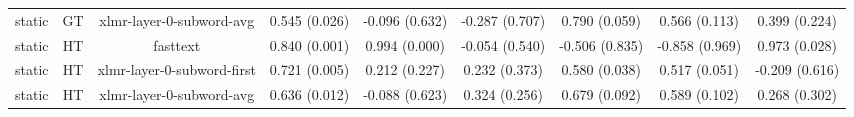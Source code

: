 \begin{sidewaystable}[htb]
\begin{tabular}{@{}ccccccccc@{}}
        static & GT & xlmr-layer-0-subword-avg & 0.545 (0.026) & -0.096 (0.632) & -0.287 (0.707) & 0.790 (0.059) & 0.566 (0.113) & 0.399 (0.224) \\
        static & HT & fasttext & 0.840 (0.001) & 0.994 (0.000) & -0.054 (0.540) & -0.506 (0.835) & -0.858 (0.969) & 0.973 (0.028) \\
        static & HT & xlmr-layer-0-subword-first & 0.721 (0.005) & 0.212 (0.227) & 0.232 (0.373) & 0.580 (0.038) & 0.517 (0.051) & -0.209 (0.616) \\
        static & HT & xlmr-layer-0-subword-avg & 0.636 (0.012) & -0.088 (0.623) & 0.324 (0.256) & 0.679 (0.092) & 0.589 (0.102) & 0.268 (0.302) \\
        \bottomrule
    \end{tabular}
\end{sidewaystable}